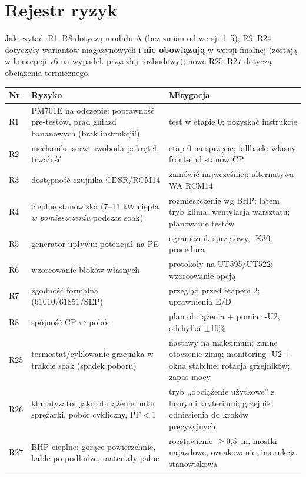 \documentclass[11pt,a4paper]{article}
\begin{document}
\section{Rejestr ryzyk}
Jak czytać: R1--R8 dotyczą modułu A (bez zmian od wersji 1--5); R9--R24 dotyczyły wariantów
magazynowych i \textbf{nie obowiązują} w wersji finalnej (zostają w koncepcji v6 na wypadek
przyszłej rozbudowy); nowe R25--R27 dotyczą obciążenia termicznego.
\begin{longtable}{@{}p{}p{}p{}@{}}
\toprule
\textbf{Nr} & \textbf{Ryzyko} & \textbf{Mitygacja}\\
\midrule
R1 & PM701E na odczepie: poprawność pre-testów, prąd gniazd bananowych (brak instrukcji!) &
test w etapie 0; pozyskać instrukcję\\
R2 & mechanika serw: swoboda pokręteł, trwałość & etap 0 na sprzęcie; fallback: własny front-end
stanów CP\\
R3 & dostępność czujnika CDSR/RCM14 & zamówić najwcześniej; alternatywa WA RCM14\\
R4 & cieplne stanowiska (7--11 kW ciepła \emph{w pomieszczeniu} podczas soak) & rozmieszczenie
wg BHP; latem tryb klima; wentylacja warsztatu; planowanie testów\\
R5 & generator upływu: potencjał na PE & ogranicznik sprzętowy, -K30, procedura\\
R6 & wzorcowanie bloków własnych & protokoły na UT595/UT522; wzorcowanie opcją\\
R7 & zgodność formalna (61010/61851/SEP) & przegląd przed etapem 2; uprawnienia E/D\\
R8 & spójność CP$\leftrightarrow$pobór & plan obciążenia $+$ pomiar -U2, odchyłka $\pm$10\%\\
R25 & termostat/cyklowanie grzejnika w trakcie soak (spadek poboru) & nastawy na maksimum;
zimne otoczenie zimą; monitoring -U2 $+$ okna stabilne; rotacja grzejników; zapas mocy\\
R26 & klimatyzator jako obciążenie: udar sprężarki, pobór cykliczny, PF$<$1 & tryb ,,obciążenie
użytkowe'' z luźnymi kryteriami; grzejnik odniesienia do kroków precyzyjnych\\
R27 & BHP cieplne: gorące powierzchnie, kable po podłodze, materiały palne & rozstawienie
$\ge$0,5~m, mostki najazdowe, oznakowanie, instrukcja stanowiskowa\\
\bottomrule
\end{longtable}
\end{document}
